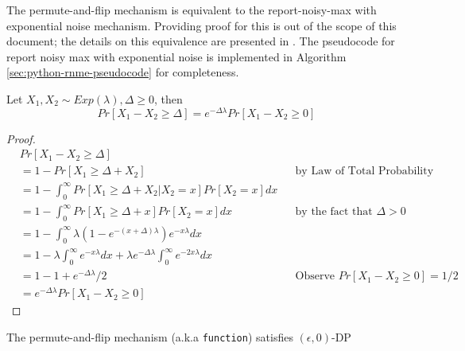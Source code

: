 \documentclass{article} %
\begin{document}
\begin{lemma}
    \label{lemma:equivalence_pf_rnme}
 The permute-and-flip mechanism is equivalent to the report-noisy-max with exponential noise mechanism. Providing proof for this is out of the scope of this document; the details on this equivalence are presented in \cite{ding2021permute}. The pseudocode for report noisy max with exponential noise is implemented in Algorithm \ref{sec:python-rnme-pseudocode} for completeness.
\end{lemma}


\begin{lemma}
    \label{lemma:diff_cdf}
 Let $X_1, X_2 \sim Exp(\lambda), \Delta \geq 0$, then 
    \begin{equation}
 Pr[X_1 - X_2 \geq \Delta] = e^{-\Delta\lambda} Pr[X_1 - X_2 \geq 0]  
    \end{equation}

    \begin{proof}
        \begin{align}
        & Pr[X_1 - X_2 \geq \Delta] \\
        & = 1 - Pr[X_1 \geq \Delta + X_2]  && \text{by Law of Total Probability}\\
        & = 1 - \int^\infty_0 Pr[X_1 \geq \Delta + X_2 | X_2 = x] Pr[X_2 = x] dx  \\
        & = 1 - \int^\infty_0 Pr[X_1 \geq \Delta + x]Pr[X_2 = x] dx  && \text{by the fact that } \Delta >0 \\
        & = 1 - \int^\infty_0 \lambda(1 - e^{-(x + \Delta)\lambda})e^{-x\lambda}dx  \\
        & = 1 - \lambda \int^\infty_0 e^{-x\lambda} dx + \lambda e^{-\Delta\lambda} \int_0^\infty e^{-2x\lambda}dx \\
        & = 1 - 1 + e^{-\Delta\lambda} / 2 && \text{Observe $Pr[X_1 - X_2 \geq 0] = 1/2$} \\
        & = e ^{-\Delta\lambda} Pr[X_1 - X_2 \geq 0] 
    \end{align}
    \end{proof}
\end{lemma}

\newcommand\logeq{\mathrel{\vcentcolon\Leftrightarrow}}

\begin{theorem}
 The permute-and-flip mechanism (a.k.a \texttt{function}) satisfies $(\epsilon, 0)$-DP
\end{theorem}
\end{document}

